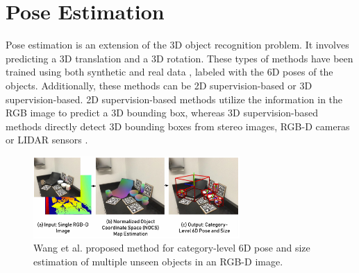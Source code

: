 \section{Pose Estimation}\label{chap:2:pose}
Pose estimation is an extension of the 3D object recognition problem. It involves predicting a 3D translation and a 3D rotation. These types of methods have been trained using both synthetic \cite{gupta2015aligning} and real data \cite{li2019gs3d}, labeled with the 6D poses of the objects. Additionally, these methods can be 2D supervision-based or 3D supervision-based. 2D supervision-based methods utilize the information in the RGB image to predict a 3D bounding box, whereas 3D supervision-based methods directly detect 3D bounding boxes from stereo images, RGB-D cameras or LIDAR sensors \cite{sahin2020review}. 
\begin{figure}[!ht]
        \centering
        \includegraphics[width=0.7\textwidth]{images/wang-pose}
        \caption{Wang et al. proposed method for category-level 6D pose and
size estimation of multiple unseen objects in an RGB-D image.}
        \label{fig:wang-pose}
    \end{figure}
    
